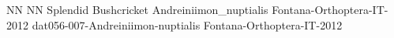 {NN} %
{NN} %
{Splendid Bushcricket} %
{Andreiniimon_nuptialis} %
{Fontana-Orthoptera-IT-2012}%
{} %
{\url{}} %
{} %
{} %
{dat056-007-Andreiniimon-nuptialis} %
{Fontana-Orthoptera-IT-2012}%
